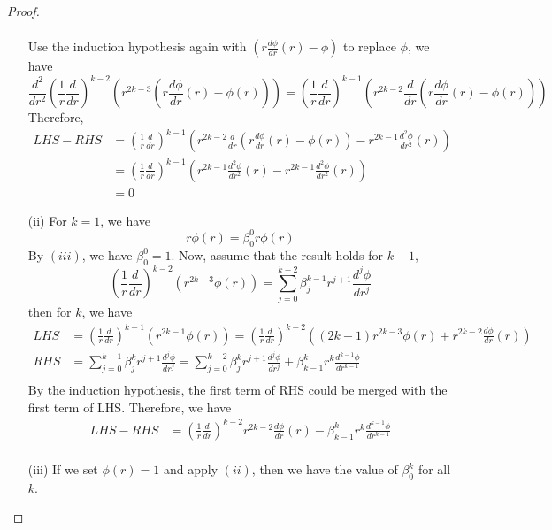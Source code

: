 \documentclass[10pt]{article}
\begin{document}
\begin{proof}
\begin{itemize}
\begin{align*}
        \end{align*}
        Use the induction hypothesis again with $\left(r\frac{d\phi}{dr}(r)-\phi\right)$ to replace $\phi$, we have
        \begin{equation*}
        \frac{d^2}{dr^2}\left(\frac{1}{r}\frac{d}{dr}\right)^{k-2}\left(r^{2k-3}\left(r\frac{d\phi}{dr}(r)-\phi(r)\right)\right) = \left(\frac{1}{r}\frac{d}{dr}\right)^{k-1}\left(r^{2k-2}\frac{d}{dr}\left(r\frac{d\phi}{dr}(r)-\phi(r)\right)\right)
        \end{equation*}
        Therefore, 
        \begin{align*}
            LHS-RHS& = \left(\frac{1}{r}\frac{d}{dr}\right)^{k-1}\left(r^{2k-2}\frac{d}{dr}\left(r\frac{d\phi}{dr}(r)-\phi(r)\right)-r^{2k-1}\frac{d^2\phi}{dr^2}(r)\right) \\
                &= \left(\frac{1}{r}\frac{d}{dr}\right)^{k-1}\left(r^{2k-1}\frac{d^2\phi}{dr^2}(r)-r^{2k-1}\frac{d^2\phi}{dr^2}(r)\right)\\
                &= 0
        \end{align*}
        \item [(ii)] For $k=1$, we have
        \begin{equation*}
            r\phi(r) = \beta_0^0 r \phi(r)
        \end{equation*}
        By $(iii)$, we have $\beta_0^0 = 1$. Now, assume that the result holds for $k-1$,
        \begin{equation*}
            \left(\frac{1}{r}\frac{d}{dr}\right)^{k-2}(r^{2k-3}\phi(r)) = \sum_{j=0}^{k-2} \beta_j^{k-1}r^{j+1}\frac{d^j\phi}{dr^j}
        \end{equation*}
        then for $k$, we have
        \begin{align*}
            LHS &= \left(\frac{1}{r}\frac{d}{dr}\right)^{k-1}(r^{2k-1}\phi(r)) = \left(\frac{1}{r}\frac{d}{dr}\right)^{k-2}\left((2k-1)r^{2k-3}\phi(r)+r^{2k-2}\frac{d\phi}{dr}(r)\right)\\
            RHS &= \sum_{j=0}^{k-1} \beta_j^{k}r^{j+1}\frac{d^j\phi}{dr^j} = \sum_{j=0}^{k-2} \beta_j^{k}r^{j+1}\frac{d^j\phi}{dr^j}+\beta_{k-1}^{k}r^{k}\frac{d^{k-1}\phi}{dr^{k-1}}\\
        \end{align*}
        By the induction hypothesis, the first term of RHS could be merged with the first term of LHS. Therefore, we have
        \begin{align*}
            LHS-RHS &= \left(\frac{1}{r}\frac{d}{dr}\right)^{k-2}r^{2k-2}\frac{d\phi}{dr}(r) - \beta_{k-1}^{k}r^{k}\frac{d^{k-1}\phi}{dr^{k-1}}\\
        \end{align*}
        \item [(iii)] If we set $\phi(r) = 1$ and apply $(ii)$, then we have the value of $\beta_0^k$ for all $k$. 
    \end{itemize}
\end{proof}
\end{document}
